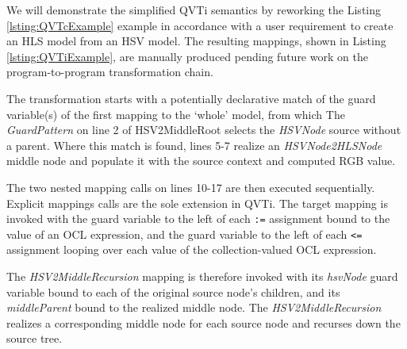 We will demonstrate the simplified QVTi semantics by reworking the Listing \ref{lsting:QVTcExample} example in accordance with a user requirement to create an HLS model from an HSV model. The resulting mappings, shown in Listing \ref{lsting:QVTiExample}, are manually produced pending future work on the program-to-program transformation chain.




The transformation starts with a potentially declarative match of the guard variable(s) of the first mapping to the `whole' model, from which  The \textit{GuardPattern} on line 2 of HSV2MiddleRoot selects the \textit{HSVNode} source without a parent.
Where this  match is found, lines 5-7 realize an \textit{HSVNode2HLSNode} middle node and populate it with the source context and computed RGB value.

The two nested mapping calls on lines 10-17 are then executed sequentially. Explicit mappings calls are the sole extension in QVTi. The target mapping is invoked with the guard variable to the left of each \texttt{:=} assignment bound to the value of an OCL expression, and the guard variable to the left of each \texttt{<=} assignment looping over each value of the collection-valued OCL expression.

The \textit{HSV2MiddleRecursion} mapping is therefore invoked with its \textit{hsvNode} guard variable bound to each of the original source node's children, and its \textit{middleParent} bound to the realized middle node. The \textit{HSV2MiddleRecursion} realizes a corresponding middle node for each source node and recurses down the source tree.

